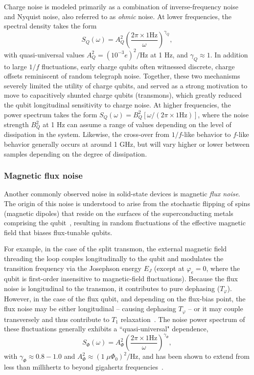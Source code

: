 \documentclass[aip,apr,twocolumn,showpacs,superscriptaddress,groupedaddress,nofootinbib,reprint]{revtex4-1}  %
\begin{document}
Charge noise is modeled primarily as a combination of inverse-frequency noise and Nyquist noise, also referred to as \textit{ohmic} noise. At lower frequencies, the spectral density takes the form
\begin{equation}\label{eqn:charge-1_f}
  S_Q(\omega) = A_Q^2 \left( \frac{2 \pi \times 1\mathrm{Hz}}{\omega} \right)^{\gamma_Q},
\end{equation}
with quasi-universal values $A_Q^2 = (10^{-3}e)^2/\mathrm{Hz}$ at 1 Hz, and $\gamma_Q \approx 1$. In addition to large $1/f$ fluctuations, early charge qubits often witnessed discrete, charge offsets reminiscent of random telegraph noise. Together, these two mechanisms severely limited the utility of charge qubits, and served as a strong motivation to move to capacitively shunted charge qubits (transmons), which greatly reduced the qubit longitudinal sensitivity to charge noise. At higher frequencies, the power spectrum takes the form $S_Q(\omega) = B_Q^2 [\omega/ (2 \pi \times 1 \mathrm{Hz})]$,
where the noise strength $B_Q^2$ at 1 Hz can assume a range of values depending on the level of dissipation in the system. Likewise, the cross-over from $1/f$-like behavior to $f$-like behavior generally occurs at around 1 GHz, but will vary higher or lower between samples depending on the degree of dissipation\cite{Astafiev2004,Yan2016}.

\subsubsection{Magnetic flux noise}
Another commonly observed noise in solid-state devices is magnetic \textit{flux noise}.
The origin of this noise is understood to arise from the stochastic flipping of spins (magnetic dipoles) that reside on the surfaces of the superconducting metals comprising the qubit~\cite{KochRoger2007}, resulting in random fluctuations of the effective magnetic field that biases flux-tunable qubits.

For example, in the case of the split transmon, the external magnetic field threading the loop couples longitudinally to the qubit and modulates the transition frequency via the Josephson energy $E_J$ (except at $\varphi_e = 0$, where the qubit is first-order insensitive to magnetic-field fluctuations). Because the flux noise is longitudinal to the transmon, it contributes to pure dephasing ($T_{\varphi}$). However, in the case of the flux qubit, and depending on the flux-bias point, the flux noise may be either longitudinal --  causing dephasing $T_{\varphi}$ -- or it may couple transversely and thus contribute to $T_1$ relaxation~\cite{Bylander2011,Yan2016}.
%
The noise power spectrum of these fluctuations generally exhibits a ``quasi-universal" dependence,
\begin{equation}\label{eqn:charge-1_f}
  S_{\Phi}(\omega) = A_{\Phi}^2 \left( \frac{2 \pi \times 1\mathrm{Hz}}{\omega} \right)^{\gamma_{\Phi}},
\end{equation}
with $\gamma_{\Phi} \approx 0.8-1.0$ and $A_{\Phi}^2 \approx (1 \; \mu \Phi_0)^2/\mathrm{Hz}$, and has been shown to extend from less than millihertz to beyond gigahertz frequencies~\cite{Wellstood1987,Bylander2011,Yan2012,Yan2013,Slichter2012}.
\end{document}
